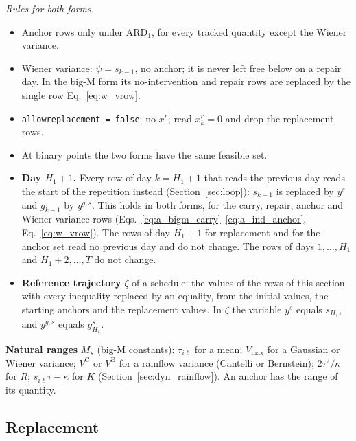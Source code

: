 \documentclass[11pt,a4paper]{article}
\theoremstyle{plain}
\theoremstyle{definition}
\newcommand{\ARDone}{\mathrm{ARD}_{1}}
\renewcommand{\_}{\textunderscore\allowbreak{}}
\begin{document}
\emph{Rules for both forms.}
\begin{itemize}[nosep,leftmargin=1.5em]
  \item Anchor rows only under $\ARDone$, for every tracked quantity except the Wiener
        variance.
  \item Wiener variance: $\psi = s_{k-1}$, no anchor; it is never left free below on
        a repair day. In the big-M form its no-intervention and repair rows are
        replaced by the single row Eq.~\eqref{eq:w_vrow}.
  \item \texttt{allow\_replacement = false}: no $x^r$; read $x^r_k = 0$ and drop the
        replacement rows.
  \item At binary points the two forms have the same feasible set.
  \item \textbf{Day $H_1 + 1$.} Every row of day $k = H_1 + 1$ that reads the previous
        day reads the start of the repetition instead (Section~\ref{sec:loop}):
        $s_{k-1}$ is replaced by $y^s$ and $g_{k-1}$ by $y^{g,s}$. This holds in both
        forms, for the carry, repair, anchor and Wiener variance rows
        (Eqs.~\eqref{eq:a_bigm_carry}--\eqref{eq:a_ind_anchor}, Eq.~\eqref{eq:w_vrow}).
        The rows of day $H_1 + 1$ for replacement and for the anchor set read no
        previous day and do not change. The rows of days $1, \ldots, H_1$ and
        $H_1 + 2, \ldots, T$ do not change.
  \item \textbf{Reference trajectory} $\zeta$ of a schedule: the values of the rows of this section with every inequality replaced by an equality, from the initial values, the starting anchors and the replacement values. In $\zeta$ the variable $y^s$ equals $s_{H_1}$, and $y^{g,s}$ equals $g^s_{H_1}$.
\end{itemize}

\textbf{Natural ranges} $M_s$ (big-M constants): $\tau_{i\ell}$ for a mean;
$V_{\max}$ for a Gaussian or Wiener variance; $V^{\mathrm{C}}$ or $V^{\mathrm{B}}$ for
a rainflow variance (Cantelli or Bernstein); $2\tau^2/\kappa$ for $R$;
$s_{i\ell}\tau - \kappa$ for $K$ (Section~\ref{sec:dyn_rainflow}). An anchor has the
range of its quantity.

\subsection{Replacement}
\label{sec:replacement}
\end{document}
